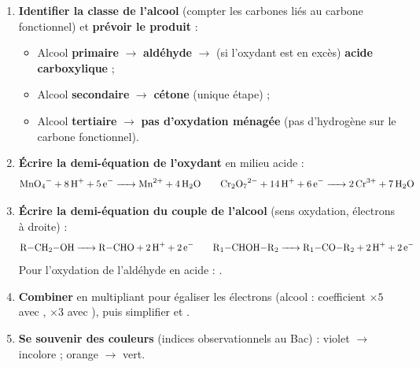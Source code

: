\documentclass[11pt]{article}
\begin{document}
\begin{methode}
\begin{enumerate}
\item \textbf{Identifier la classe de l'alcool} (compter les carbones liés au carbone fonctionnel) et \textbf{prévoir le produit} :
\begin{itemize}
\item Alcool \textbf{primaire} $\rightarrow$ \textbf{aldéhyde} $\rightarrow$ (si l'oxydant est en excès) \textbf{acide carboxylique} ;
\item Alcool \textbf{secondaire} $\rightarrow$ \textbf{cétone} (unique étape) ;
\item Alcool \textbf{tertiaire} $\rightarrow$ \textbf{pas d'oxydation ménagée} (pas d'hydrogène sur le carbone fonctionnel).
\end{itemize}
\item \textbf{Écrire la demi-équation de l'oxydant} en milieu acide :
\[ \ce{MnO4^- + 8 H+ + 5 e- -> Mn^2+ + 4 H2O} \qquad \ce{Cr2O7^2- + 14 H+ + 6 e- -> 2 Cr^3+ + 7 H2O} \]
\item \textbf{Écrire la demi-équation du couple de l'alcool} (sens oxydation, électrons à droite) :
\[ \ce{R-CH2-OH -> R-CHO + 2 H+ + 2 e-} \qquad \ce{R1-CHOH-R2 -> R1-CO-R2 + 2 H+ + 2 e-} \]
Pour l'oxydation de l'aldéhyde en acide : .
\item \textbf{Combiner} en multipliant pour égaliser les électrons (alcool : coefficient $\times 5$ avec , $\times 3$ avec ), puis simplifier  et .
\item \textbf{Se souvenir des couleurs} (indices observationnels au Bac) :  violet $\rightarrow$  incolore ;  orange $\rightarrow$  vert.
\end{enumerate}
\end{methode}
\end{document}
